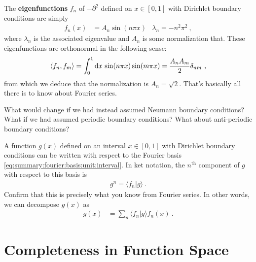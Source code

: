 \begin{example}\label{ex:summary:eigenfunction:fourier}
The \textbf{eigenfunctions} $f_n$ of $-\partial^2$ defined on $x\in [0,1]$ with Dirichlet boundary conditions are simply 
\begin{align}
  f_n(x) &= A_n \sin(n\pi x) 
  &
  \lambda_n = - n^2\pi^2 \ ,
  \label{eq:summary:fourier:basis:unit:interval}
\end{align}
where $\lambda_n$ is the associated eigenvalue and $A_n$ is some normalization that. These eigenfunctions are orthonormal in the following sense:
\begin{align}
  \langle f_n, f_m\rangle = \int_0^1 \operatorname{d}\mkern-3mu^{}\mkern-1mu{x} \, \sin(n\pi x)\sin(m\pi x) = \frac{A_nA_m}{2} \delta_{nm} \ ,
\end{align}
from which we deduce that the normalization is $A_n = \sqrt{2}$. That's basically all there is to know about Fourier series.
\end{example}
\begin{exercise}
What would change if we had instead assumed Neumann boundary conditions? What if we had assumed periodic boundary conditions? What about anti-periodic boundary conditions?
\end{exercise}
\begin{exercise}\label{ex:summary:eigenfunction:fourier:2}
A function $g(x)$ defined on an interval $x\in [0,1]$ with Dirichlet boundary conditions can be written with respect to the Fourier basis \eqref{eq:summary:fourier:basis:unit:interval}. In ket notation, the $n^\text{th}$ component of $g$ with respect to this basis is
\begin{align}
  g^n = \langle f_n| g\rangle \ .
\end{align}
Confirm that this is precisely what you know from Fourier series. In other words, we can decompose $g(x)$ as
\begin{align}
  g(x) &= \sum_n \langle f_n| g\rangle f_n(x)  \ .
\end{align}
\end{exercise}

\section{Completeness in Function Space}

